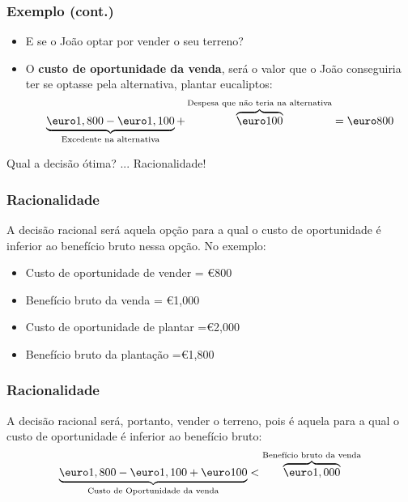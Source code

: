 \begin{frame}
	\frametitle{Exemplo (cont.)}
	\begin{itemize}
		\item E se o Jo\~ao optar por vender o seu terreno?\pause
		\item O \textbf{custo de oportunidade da venda}, ser\'a o valor que o Jo\~ao conseguiria ter se optasse pela alternativa, plantar eucaliptos:\pause
		\begin{align}
			\underbrace{\textup{\euro}1,800 - \textup{\euro}1,100}_{\text{Excedente na alternativa}} + \overbrace{\textup{\euro}100}^{\text{Despesa que n\~ao teria na alternativa}} = \textup{\euro} 800
		\end{align}
	\end{itemize}
\end{frame}

\begin{frame}
	\begin{center}	
	{\huge Qual a decis\~ao \'otima? \pause \vspace{0.5cm} ... Racionalidade!}
	\end{center}
\end{frame}

\begin{frame}
	\frametitle{Racionalidade}

	A decis\~ao racional ser\'a aquela op\c c\~ao para a qual o custo de oportunidade \'e inferior ao benef\'icio bruto nessa op\c c\~ao. No exemplo: \pause

	\begin{itemize}
		\item Custo de oportunidade de vender = \pause \euro 800
		\item Benef\'icio bruto da venda = \pause \euro 1,000 \pause
	\end{itemize}

	\vspace{0.2cm}

	\begin{itemize}
		\item Custo de oportunidade de plantar =\pause \euro 2,000\pause
		\item Benef\'icio bruto da planta\c c\~ao =\pause \euro 1,800
	\end{itemize}
\end{frame}

\begin{frame}
	\frametitle{Racionalidade}
	A decis\~ao racional ser\'a, portanto, vender o terreno, pois \'e aquela para a qual o custo de oportunidade \'e inferior ao benef\'icio bruto:
	\begin{align}
		\underbrace{\textup{\euro} 1,800 - \textup{\euro} 1,100 + \textup{\euro} 100}_{\text{Custo de Oportunidade da venda}} < \overbrace{\textup{\euro} 1,000}^{\text{Benef\'icio bruto da venda}}
	\end{align}
\end{frame}

